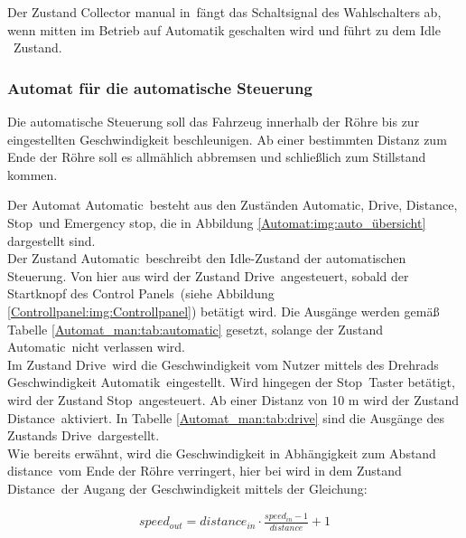 Der Zustand \frqq Collector manual in\flqq\ fängt  das Schaltsignal des Wahlschalters ab, wenn mitten im Betrieb auf Automatik geschalten wird und führt zu dem \frqq Idle \flqq\ Zustand.









\subsubsection{Automat für die automatische Steuerung}
\label{Automatensteuerung:Automat_auto}


Die automatische Steuerung soll das Fahrzeug innerhalb der Röhre bis zur eingestellten Geschwindigkeit beschleunigen. Ab einer bestimmten Distanz zum Ende der Röhre soll es allmählich abbremsen und schließlich zum Stillstand kommen.

Der Automat \frqq Automatic\flqq\ besteht aus den Zuständen \frqq Automatic\flqq, \frqq Drive\flqq, \frqq Distance\flqq, \frqq Stop\flqq\ und \frqq Emergency stop\flqq, die in Abbildung \ref{Automat:img:auto_übersicht} dargestellt sind.\\
Der Zustand \frqq Automatic\flqq\ beschreibt den Idle-Zustand der automatischen Steuerung. Von hier aus wird der Zustand \frqq Drive\flqq\ angesteuert, sobald der Startknopf des \frqq Control Panels\flqq\ (siehe Abbildung \ref{Controllpanel:img:Controllpanel}) betätigt wird. Die Ausgänge werden gemäß Tabelle \ref{Automat_man:tab:automatic} gesetzt, solange der Zustand \frqq Automatic\flqq\ nicht verlassen wird.\\
Im Zustand \frqq Drive\flqq\ wird die Geschwindigkeit vom Nutzer mittels des Drehrads \frqq Geschwindigkeit Automatik\flqq\ eingestellt. Wird hingegen der \frqq Stop\flqq\ Taster betätigt, wird der Zustand \frqq Stop\flqq\ angesteuert. Ab einer Distanz von 10 m wird der Zustand \frqq Distance\flqq\ aktiviert. In Tabelle \ref{Automat_man:tab:drive} sind die Ausgänge des Zustands \frqq Drive\flqq\ dargestellt.\\
Wie bereits erwähnt, wird die Geschwindigkeit in Abhängigkeit zum Abstand \frqq distance\flqq\ vom Ende der Röhre verringert, hier bei wird in dem Zustand \frqq Distance\flqq\ der Augang der Geschwindigkeit mittels der Gleichung:

\pagebreak[1]
\begin{align}
	\label{eq:speedout}
	speed_{out} = distance_{in}\cdot\frac{speed_{in}-1}{distance}+1
\end{align}
\pagebreak[1]

